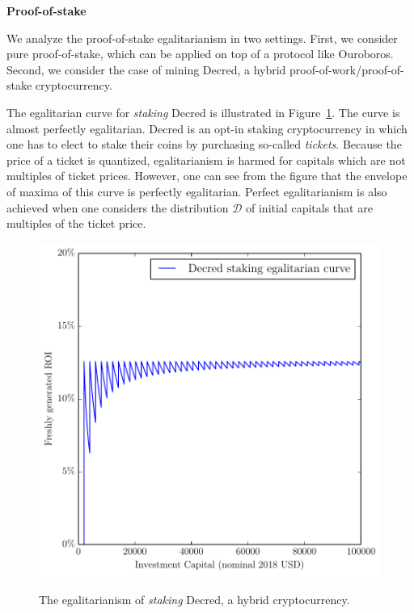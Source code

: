 
\noindent\textbf{Proof-of-stake}

\noindent
We analyze the proof-of-stake egalitarianism in two settings. First, we
consider pure proof-of-stake, which can be applied on top of a protocol like
Ouroboros. Second, we consider the case of mining Decred, a hybrid
proof-of-work/proof-of-stake cryptocurrency.

The egalitarian curve for \emph{staking} Decred is illustrated in
Figure~\ref{fig:decred-stake}. The curve is almost perfectly egalitarian. Decred
is an opt-in staking cryptocurrency in which one has to elect to stake their
coins by purchasing so-called \emph{tickets}. Because the price of a ticket is
quantized, egalitarianism is harmed for capitals which are not multiples of
ticket prices. However, one can see from the figure that the envelope of maxima
of this curve is perfectly egalitarian. Perfect egalitarianism is also achieved
when one considers the distribution $\mathcal{D}$ of initial capitals that are
multiples of the ticket price.

\begin{figure}[H]
    \caption{The egalitarianism of \emph{staking} Decred, a hybrid cryptocurrency.}
    \centering
    \includegraphics[width=0.75 \columnwidth,keepaspectratio]{figures/decred-stake.pdf}
    \label{fig:decred-stake}
\end{figure}

